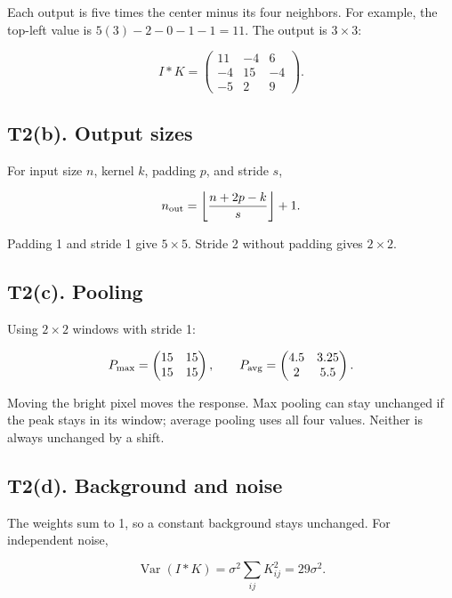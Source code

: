 \documentclass[11pt,a4paper]{article}
\begin{document}
Each output is five times the center minus its four neighbors. For example, the top-left value is $5(3)-2-0-1-1=11$. The output is $3\times3$:

\[
I*K=\begin{pmatrix}11&-4&6\\-4&15&-4\\-5&2&9\end{pmatrix}.
\]


\subsection*{T2(b). Output sizes}

For input size $n$, kernel $k$, padding $p$, and stride $s$,

\[
n_{\rm out}=\left\lfloor\frac{n+2p-k}{s}\right\rfloor+1.
\]

Padding 1 and stride 1 give $5\times5$. Stride 2 without padding gives $2\times2$.


\subsection*{T2(c). Pooling}

Using $2\times2$ windows with stride 1:

\[
P_{\max}=\begin{pmatrix}15&15\\15&15\end{pmatrix},\qquad P_{\rm avg}=\begin{pmatrix}4.5&3.25\\2&5.5\end{pmatrix}.
\]

Moving the bright pixel moves the response. Max pooling can stay unchanged if the peak stays in its window; average pooling uses all four values. Neither is always unchanged by a shift.


\subsection*{T2(d). Background and noise}

The weights sum to 1, so a constant background stays unchanged. For independent noise,

\[
\operatorname{Var}(I*K)=\sigma^2\sum_{ij}K_{ij}^2=29\sigma^2.
\]
\end{document}
